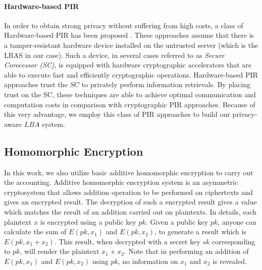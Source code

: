 \paragraph{Hardware-based PIR}
In order to obtain strong privacy without suffering from high costs, a class of Hardware-based PIR has been proposed \cite{PIR_SC_2002, PIR_SC_2004, PIR_SC_2006}. These approaches assume that there is a tamper-resistant hardware device installed on the untrusted server (which is the LBAS in our case). Such a device, in several cases referred to as \textit{Secure Corocessor (SC)}, is equipped with hardware cryptographic accelerators that are able to execute fast and efficiently cryptographic operations.
Hardware-based PIR approaches trust the $SC$  to privately perform information retrievals. By placing trust on the SC, these techniques are able to achieve optimal communication and computation costs in comparison with cryptographic PIR approaches. Because of this very advantage, we employ this class of PIR approaches to build our privacy-aware $LBA$ system. 




\subsection{Homomorphic Encryption}
In this work, we also utilize basic additive homomorphic encryption to carry out the accounting. Additive homomorphic encryption system is an asymmetric cryptosystem that allows addition operation to be performed on ciphertexts and gives an encrypted result. The decryption of such a encrypted result gives a value which matches the result of an addition carried out on plaintexts. In details, each plaintext $x$ is encrypted using a public key $pk$. Given a public key $pk$, anyone can calculate the sum of $E(pk, x_1)$ and $E(pk, x_2)$, to generate a result which is $E(pk, x_1 + x_2)$. This result, when decrypted with a secret key $sk$ corresponding to $pk$, will render the plaintext $x_1 + x_2$. Note that in performing an addition of $E(pk, x_1)$ and $E(pk, x_2)$ using $pk$, no information on $x_1$ and $x_2$ is revealed.

































